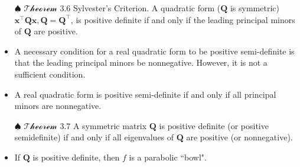\documentclass[12pt,thmsa]{article}
\begin{document}
\begin{itemize}
	\item[\(\spadesuit\)] \(\mathcal{Theorem}\) 3.6 Sylvester's Criterion. A quadratic form (\(\boldsymbol{Q}\) is symmetric) \(\boldsymbol{x}^{\top} \boldsymbol{Q} \boldsymbol{x}, \boldsymbol{Q}=\boldsymbol{Q}^{\top}\), is positive definite if and only if the leading principal minors of \(\boldsymbol{Q}\) are positive.
	
	\item A necessary condition for a real quadratic form to be positive semi-definite is that the leading principal minors be nonnegative. However, it is not a sufficient condition.
	
	\item A real quadratic form is positive semi-definite if and only if all principal minors are nonnegative.
	
	\item[\(\spadesuit\)] \(\mathcal{Theorem}\) 3.7 A symmetric matrix \(\boldsymbol{Q}\) is positive definite (or positive semidefinite) if and only if all eigenvalues of \(\boldsymbol{Q}\) are positive (or nonnegative).

\end{itemize}

\begin{itemize}
	\item If \(\boldsymbol{Q}\) is positive definite, then \(f\) is a parabolic ``bowl".
\end{itemize}

\begin{center}
\end{center}
\end{document}
